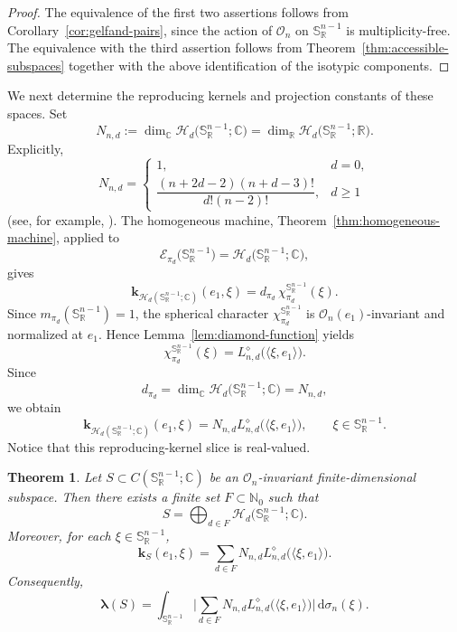 \documentclass[11pt,showkeys]{amsart}
\newtheorem{theorem}{Theorem}[section]
\begin{document}
\begin{proof}
The equivalence of the first two assertions follows from
Corollary~\ref{cor:gelfand-pairs}, since the action of
\(\mathcal O_n\) on \(\mathbb S_{\mathbb R}^{n-1}\) is multiplicity-free.
The equivalence with the third assertion follows from
Theorem~\ref{thm:accessible-subspaces} together with the above
identification of the isotypic components.
\end{proof}

We next determine the reproducing kernels and projection constants of these
spaces. Set
\[
N_{n,d}
:=
\dim_{\mathbb C}
\mathcal H_d\bigl(\mathbb S_{\mathbb R}^{n-1};\mathbb C\bigr)
=
\dim_{\mathbb R}
\mathcal H_d\bigl(\mathbb S_{\mathbb R}^{n-1};\mathbb R\bigr).
\]
Explicitly,
\[
N_{n,d}
=
\begin{cases}
1, & d=0,\\[4pt]
\dfrac{(n+2d-2)(n+d-3)!}{d!(n-2)!}, & d\geq1
\end{cases}
\]
(see, for example, \cite[Equation (18)]{defant2026minimal}).
The homogeneous machine, Theorem~\ref{thm:homogeneous-machine}, applied to
\[
\mathcal E_{\pi_d}\bigl(\mathbb S_{\mathbb R}^{n-1}\bigr)
=
\mathcal H_d\bigl(\mathbb S_{\mathbb R}^{n-1};\mathbb C\bigr),
\]
gives
\[
\mathbf k_{\mathcal H_d(\mathbb S_{\mathbb R}^{n-1};\mathbb C)}(e_1,\xi)
=
d_{\pi_d}\,
\chi_{\pi_d}^{\mathbb S_{\mathbb R}^{n-1}}(\xi).
\]
Since $m_{\pi_d}(\mathbb S_{\mathbb R}^{n-1})=1$, the spherical character
$\chi_{\pi_d}^{\mathbb S_{\mathbb R}^{n-1}}$ is
$\mathcal O_n(e_1)$-invariant and normalized at $e_1$. Hence
Lemma~\ref{lem:diamond-function} yields
\[
\chi_{\pi_d}^{\mathbb S_{\mathbb R}^{n-1}}(\xi)
=
L^\diamond_{n,d}\bigl(\langle\xi,e_1\rangle\bigr).
\]
Since
\[
d_{\pi_d}
=
\dim_{\mathbb C}
\mathcal H_d\bigl(\mathbb S_{\mathbb R}^{n-1};\mathbb C\bigr)
=N_{n,d},
\]
we obtain
\begin{equation}
\label{eq:harmonic-kernel}
\mathbf k_{\mathcal H_d(\mathbb S_{\mathbb R}^{n-1};\mathbb C)}(e_1,\xi)
=
N_{n,d}L^\diamond_{n,d}\bigl(\langle\xi,e_1\rangle\bigr),
\qquad
\xi\in\mathbb S_{\mathbb R}^{n-1}.
\end{equation}
Notice that this reproducing-kernel slice is real-valued.

\begin{theorem}
\label{prop:real-invariant-kernel}
Let
$S\subset C(\mathbb S_{\mathbb R}^{n-1};\mathbb C)$ be an
$\mathcal O_n$-invariant finite-dimensional subspace. Then there exists a
finite set $F\subset\mathbb N_0$ such that
\[
S
=
\bigoplus_{d\in F}
\mathcal H_d\bigl(\mathbb S_{\mathbb R}^{n-1};\mathbb C\bigr).
\]
Moreover, for each $\xi\in\mathbb S_{\mathbb R}^{n-1}$,
\[
\mathbf k_S(e_1,\xi)
=
\sum_{d\in F}
N_{n,d}L^\diamond_{n,d}\bigl(\langle\xi,e_1\rangle\bigr).
\]
Consequently,
\[
\boldsymbol\lambda(S)
=
\int_{\mathbb S_{\mathbb R}^{n-1}}
\bigg|
\sum_{d\in F}
N_{n,d}L^\diamond_{n,d}\bigl(\langle\xi,e_1\rangle\bigr)
\bigg|
\,\mathrm{d}\sigma_n(\xi).
\]
\end{theorem}
\end{document}
